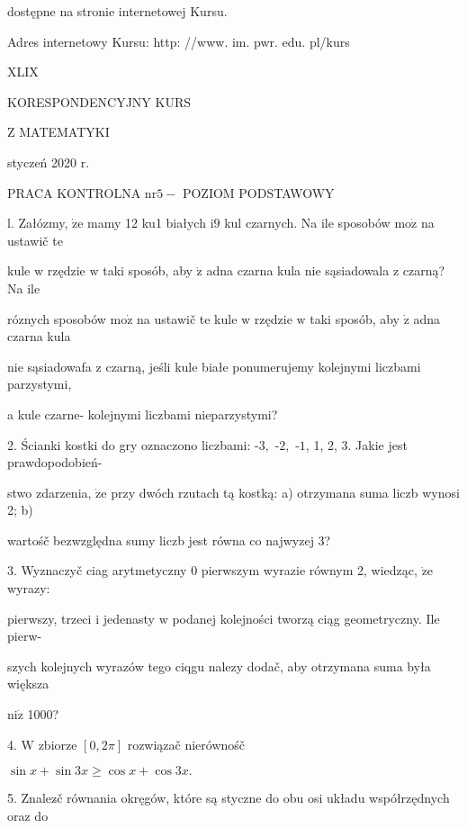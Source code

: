 \documentclass[a4paper,12pt]{article}
\begin{document}
dostępne na stronie internetowej Kursu.

Adres internetowy Kursu: http: //www. im. pwr. edu. pl/kurs







XLIX

KORESPONDENCYJNY KURS

Z MATEMATYKI

styczeń 2020 r.

PRACA KONTROLNA $\mathrm{n}\mathrm{r} 5-$ POZIOM PODSTAWOWY

l. Załózmy, $\dot{\mathrm{z}}\mathrm{e}$ mamy 12 ku1 białych $\mathrm{i}9$ kul czarnych. Na ile sposobów $\mathrm{m}\mathrm{o}\dot{\mathrm{z}}$ na ustawič te

kule $\mathrm{w}$ rzędzie $\mathrm{w}$ taki sposób, aby $\dot{\mathrm{z}}$ adna czarna kula nie sąsiadowala $\mathrm{z}$ czarną? Na ile

róznych sposobów $\mathrm{m}\mathrm{o}\dot{\mathrm{z}}$ na ustawič te kule $\mathrm{w}$ rzędzie $\mathrm{w}$ taki sposób, aby $\dot{\mathrm{z}}$ adna czarna kula

nie sąsiadowafa $\mathrm{z}$ czarną, jeśli kule białe ponumerujemy kolejnymi liczbami parzystymi,

a kule czarne- kolejnymi liczbami nieparzystymi?

2. Ścianki kostki do gry oznaczono liczbami: -$3,$ -$2,$ -$1$, 1, 2, 3. Jakie jest prawdopodobień-

stwo zdarzenia, $\dot{\mathrm{z}}\mathrm{e}$ przy dwóch rzutach tą kostką: a) otrzymana suma liczb wynosi 2; b)

wartośč bezwzględna sumy liczb jest równa co najwyzej 3?

3. Wyznaczyč ciag arytmetyczny $0$ pierwszym wyrazie równym 2, wiedząc, $\dot{\mathrm{z}}\mathrm{e}$ wyrazy:

pierwszy, trzeci $\mathrm{i}$ jedenasty $\mathrm{w}$ podanej kolejności tworzą ciąg geometryczny. Ile pierw-

szych kolejnych wyrazów tego ciqgu nalezy dodač, aby otrzymana suma była większa

$\mathrm{n}\mathrm{i}\dot{\mathrm{z}}$ 1000?

4. $\mathrm{W}$ zbiorze $[0,2\pi]$ rozwiązač nierównośč

$\sin x+\sin 3x\geq\cos x+\cos 3x.$

5. Znalez$\acute{}$č równania okręgów, które są styczne do obu osi układu współrzędnych oraz do
\end{document}

